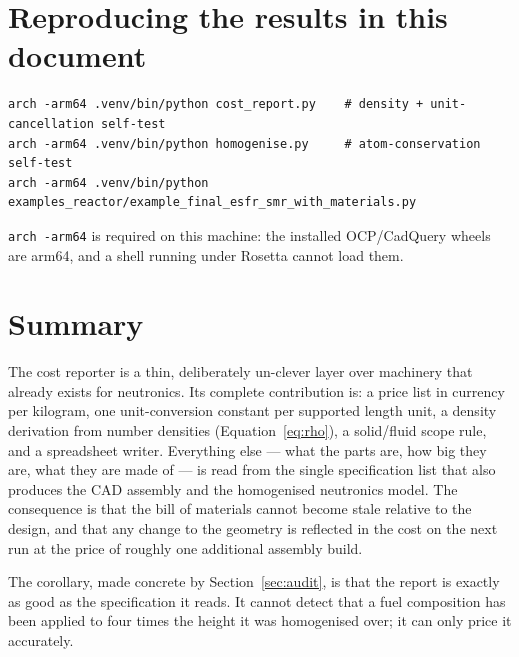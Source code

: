 \documentclass[9pt,a4paper]{extarticle}
\newcommand{\code}[1]{\texttt{\small #1}}
\begin{document}
\section{Reproducing the results in this document}

\begin{lstlisting}[basicstyle=\ttfamily\scriptsize]
arch -arm64 .venv/bin/python cost_report.py    # density + unit-cancellation self-test
arch -arm64 .venv/bin/python homogenise.py     # atom-conservation self-test
arch -arm64 .venv/bin/python examples_reactor/example_final_esfr_smr_with_materials.py
\end{lstlisting}

\code{arch -arm64} is required on this machine: the installed OCP/CadQuery
wheels are arm64, and a shell running under Rosetta cannot load them.

\section{Summary}

The cost reporter is a thin, deliberately un-clever layer over machinery that
already exists for neutronics. Its complete contribution is: a price list in
currency per kilogram, one unit-conversion constant per supported length unit,
a density derivation from number densities (Equation~\eqref{eq:rho}), a
solid/fluid scope rule, and a spreadsheet writer. Everything else --- what the
parts are, how big they are, what they are made of --- is read from the single
specification list that also produces the CAD assembly and the homogenised
neutronics model. The consequence is that the bill of materials cannot become
stale relative to the design, and that any change to the geometry is reflected
in the cost on the next run at the price of roughly one additional assembly
build.

The corollary, made concrete by Section~\ref{sec:audit}, is that the report is
exactly as good as the specification it reads. It cannot detect that a fuel
composition has been applied to four times the height it was homogenised over;
it can only price it accurately.
\end{document}
